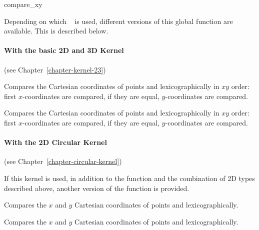\begin{ccRefFunction}{compare_xy}

Depending on which \cgal\  is used,
different versions of this global function are available. This is
described below.

\paragraph{With the basic 2D and 3D Kernel} (see Chapter~\ref{chapter-kernel-23})

      {Compares the Cartesian coordinates of points  and
        lexicographically in $xy$ order: first 
       $x$-coordinates are compared, if they are equal, $y$-coordinates
       are compared.}

      {Compares the Cartesian coordinates of points  and
        lexicographically in $xy$ order: first 
       $x$-coordinates are compared, if they are equal, $y$-coordinates
       are compared.}

\paragraph{With the 2D Circular Kernel} (see Chapter~\ref{chapter-circular-kernel}) 


If this kernel is used, in addition to the function and the
combination of 2D types described above, another version of the function
is provided.

{Compares the $x$ and $y$ Cartesian coordinates of points  and
        lexicographically.}

{Compares the $x$ and $y$ Cartesian coordinates of points  and
        lexicographically.}


\end{ccRefFunction}
